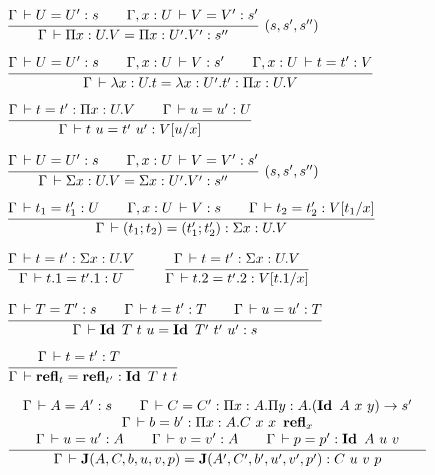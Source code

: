 \documentclass[a4paper,english]{lipics-utf8x}
\begin{document}

  \begin{center}
  \(
    \rux{\Gamma \der U = U' : s \qquad
         \Gamma, x:U \der V = V' : s'
       }{\Gamma \der \Pi x:U.V = \Pi x:U'.V' : s''
       }{(s,s',s'')}
  \)
  \end{center}

  \begin{center}
  \(
    \ru{\Gamma \der U = U' : s \qquad
        \Gamma, x:U \der V : s' \qquad
        \Gamma, x:U \der t = t' : V
      }{\Gamma \der \lambda x:U.t = \lambda x:U'.t' : \Pi x:U.V}
  \)
  \end{center}

  \begin{center}
  \(
    \ru{\Gamma \der t = t' : \Pi x:U.V \qquad
        \Gamma \der u = u' : U
      }{\Gamma \der t~u = t'~u' : V[u/x]}
  \)
  \end{center}

  \begin{center}
  \(
    \rux{\Gamma \der U = U' : s \qquad
         \Gamma, x:U \der V = V' : s'
       }{\Gamma \der \Sigma x:U.V = \Sigma x:U'.V' : s''
       }{(s,s',s'')}
  \)
  \end{center}

  \begin{center}
  \(
    \ru{\Gamma \der t_1 = t'_1 : U \qquad
        \Gamma, x:U \der V : s \qquad
        \Gamma \der t_2 = t'_2 : V[t_1/x]
      }{\Gamma \der (t_1;t_2) = (t'_1;t'_2) : \Sigma x:U.V}
  \)
  \end{center}

  \begin{center}
  \(
    \ru{\Gamma \der t = t' : \Sigma x:U.V
      }{\Gamma \der t.1 = t'.1 : U}
    \qquad
    \ru{\Gamma \der t = t' : \Sigma x:U.V
      }{\Gamma \der t.2 = t'.2 : V[t.1/x]}
  \)
  \end{center}

  \begin{center}
  \(
    \ru{\Gamma \der T = T' : s \qquad
        \Gamma \der t = t' : T \qquad
        \Gamma \der u = u' : T
      }{\Gamma \der \Id T\ t\ u = \Id T'\ t'\ u' : s}
  \)
  \end{center}

  \begin{center}
  \(
    \ru{\Gamma \der t = t' : T \qquad
      }{\Gamma \der \refl_t = \refl_{t'} : \Id T\ t\ t}
  \)
  \end{center}

  \begin{center}
  \(
    \tru{\Gamma \der A = A' : s \qquad
         \Gamma \der C = C' : \Pi x:A. \Pi y:A. (\Id A\ x\ y) \to s'
       }{\Gamma \der b = b' : \Pi x:A. C\ x\ x\ \refl_x
       }{\Gamma \der u = u' : A \qquad
         \Gamma \der v = v' : A \qquad
         \Gamma \der p = p' : \Id A\ u\ v
       }{\Gamma \der \J (A,C,b,u,v,p) = \J (A',C',b',u',v',p') : C\ u\ v\ p}
  \)
  \end{center}
\end{document}
